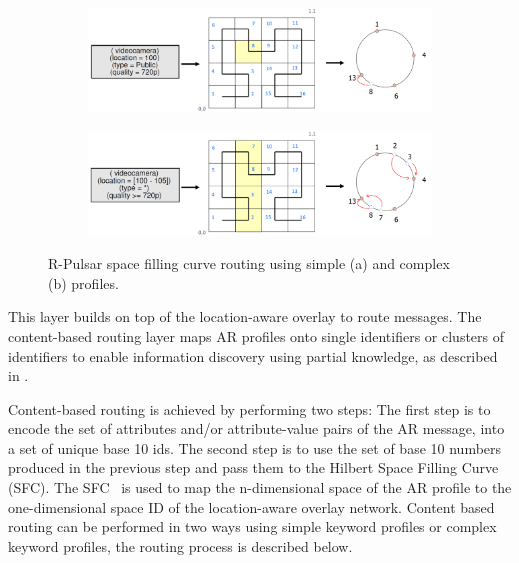 \begin{figure}
\centering
\begin{subfigure}[b]{0.9\textwidth}
   \includegraphics[width=1\linewidth]{Figures/single.pdf}
   \caption{}
\end{subfigure}
\begin{subfigure}[b]{0.9\textwidth}
   \includegraphics[width=1\linewidth]{Figures/multi.pdf}
   \caption{}
\end{subfigure}
\caption{R-Pulsar space filling curve routing using simple (a) and complex (b) profiles.}\label{fig:routingProfiles} 
\end{figure}


This layer builds on top of the location-aware overlay to route messages. The content-based routing layer maps AR profiles onto single identifiers or clusters of identifiers to enable information discovery using partial knowledge, as described in \cite{SCHMIDT2008962}.

Content-based routing is achieved by performing two steps: The first step is to encode the set of attributes and/or attribute-value pairs of the AR message, into a set of unique base 10 ids. The second step is to use the set of base 10 numbers produced in the previous step and pass them to the Hilbert Space Filling Curve (SFC). The SFC~\cite{SFC} is used to map the n-dimensional space of the AR profile to the one-dimensional space ID of the location-aware overlay network. Content based routing can be performed in two ways using simple keyword profiles or complex keyword profiles, the routing process is described below.


